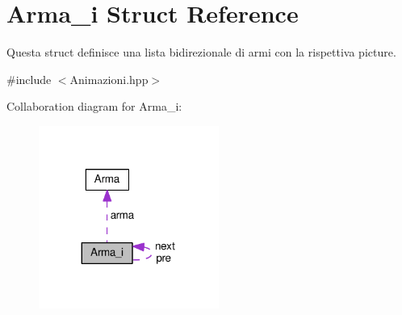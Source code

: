 \hypertarget{structArma__i}{}\section{Arma\+\_\+i Struct Reference}
\label{structArma__i}


Questa struct definisce una lista bidirezionale di armi con la rispettiva picture.  




{\ttfamily \#include $<$Animazioni.\+hpp$>$}



Collaboration diagram for Arma\+\_\+i\+:\nopagebreak
\begin{figure}[H]
\begin{center}
\leavevmode
\includegraphics[width=167pt]{structArma__i__coll__graph}
\end{center}
\end{figure}
